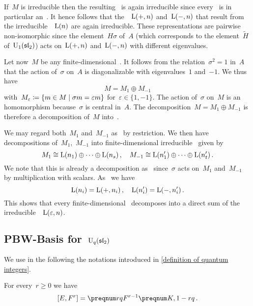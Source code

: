 \documentclass[a4paper, 11pt, oneside]{scrartcl}
\begin{document}
If~$M$ is irreducible then the resulting~ is again irreducible since every~ is in particular an~.
It hence follows that the~~$\operatorname{L}(+,n)$ and~$\operatorname{L}(-,n)$ that result from the irreducible~~$\operatorname{L}(n)$ are again irreducible.
These representations are pairwise non-isomorphic since the element~$H \sigma$ of~$A$ (which corresponds to the element~$\widetilde{H}$ of~$\operatorname{U}_1(\mathfrak{sl}_2)$) acts on~$\operatorname{L}(+,n)$ and~$\operatorname{L}(-,n)$ with different eigenvalues.

Let now~$M$ be any finite-dimensional~.
It follows from the relation~$\sigma^2 = 1$ in~$A$ that the action of~$\sigma$ on~$A$ is diagonalizable with eigenvalues~$1$ and~$-1$.
We thus have
\[
  M = M_{1} \oplus M_{-1}
\]
with~$M_\varepsilon \defined \{ m \in M \suchthat \sigma m = \varepsilon m \}$ for~$\varepsilon \in \{ 1, -1 \}$.
The action of~$\sigma$ on~$M$ is an~ homomorphism because~$\sigma$ is central in~$A$.
The decomposition~$M = M_{1} \oplus M_{-1}$ is therefore a decomposition of~$M$ into~.

We may regard both~$M_1$ and~$M_{-1}$ as~ by restriction.
We then have decompositions of~$M_1$,~$M_{-1}$ into finite-dimensional irreducible~ given by
\[
  M_1
  \cong
  \operatorname{L}(n_1) \oplus \dotsb \oplus \operatorname{L}(n_s) \,,
  \quad
  M_{-1}
  \cong
  \operatorname{L}(n'_1) \oplus \dotsb \oplus \operatorname{L}(n'_t) \,.
\]
We note that this is already a decomposition as~ since~$\sigma$ acts on~$M_1$ and~$M_{-1}$ by multiplication with scalars.
As~ we have
\[
  \operatorname{L}(n_i) = \operatorname{L}(+, n_i) \,,
  \quad
  \operatorname{L}(n'_i) = \operatorname{L}(-, n'_i) \,.
\]
This shows that every finite-dimensional~ decomposes into a direct sum of the irreducible~~$\operatorname{L}(\varepsilon, n)$.




\subsection{PBW-Basis for~\texorpdfstring{$\operatorname{U}_q(\mathfrak{sl}_2)$}{Uq(sl2)}}
\label{proof of quantum pbw}

We use in the following the notations introduced in \cref{definition of quantum integers}.

\begin{lemma}
  \label{generalized commutator relation for E and F}
  For every~$r \geq 0$ we have
  \[
    [E, F^r]
    =
    \qnum{r} F^{r-1} \qnum{K, 1-r} \,.
  \]
\end{lemma}
\end{document}
